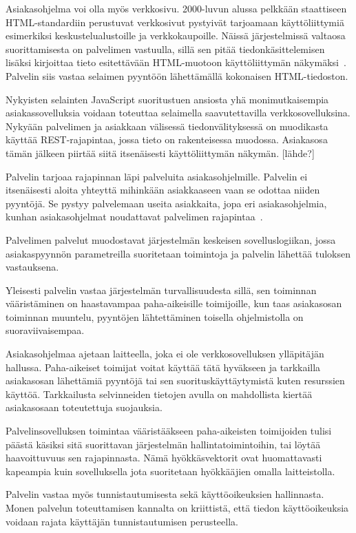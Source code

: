 \documentclass[12pt]{article}
\begin{document}
Asiakasohjelma voi olla myös verkkosivu. 2000-luvun alussa
pelkkään staattiseen HTML-standardiin perustuvat verkkosivut pystyivät
tarjoamaan käyttöliittymiä esimerkiksi keskustelualustoille ja verkkokaupoille.
Näissä järjestelmissä valtaosa suorittamisesta on palvelimen vastuulla,
sillä sen pitää tiedonkäsittelemisen lisäksi kirjoittaa tieto
esitettävään HTML-muotoon käyttöliittymän näkymäksi~\cite{tatsubori_html_2009}. Palvelin
siis vastaa selaimen pyyntöön lähettämällä kokonaisen HTML-tiedoston.

Nykyisten selainten JavaScript suoritustuen ansiosta yhä
monimutkaisempia asiakassovelluksia voidaan toteuttaa
selaimella saavutettavilla verkkosovelluksina.
Nykyään palvelimen ja asiakkaan
välisessä tiedonvälityksessä on muodikasta käyttää REST-rajapintaa, jossa
tieto on rakenteisessa muodossa. Asiakasosa tämän jälkeen piirtää siitä
itsenäisesti käyttöliittymän näkymän. [lähde?]

Palvelin tarjoaa rajapinnan läpi palveluita asiakasohjelmille.
Palvelin ei itsenäisesti aloita yhteyttä mihinkään
asiakkaaseen vaan se odottaa niiden pyyntöjä.
Se pystyy palvelemaan useita asiakkaita, jopa
eri asiakasohjelmia, kunhan asiakasohjelmat noudattavat
palvelimen rajapintaa~\cite{sinha_client-server_1992}.

Palvelimen palvelut muodostavat järjestelmän keskeisen
sovelluslogiikan, jossa asiakaspyynnön parametreilla
suoritetaan toimintoja ja palvelin lähettää
tuloksen vastauksena.

Yleisesti palvelin vastaa järjestelmän turvallisuudesta sillä,
sen toiminnan vääristäminen on haastavampaa paha-aikeisille
toimijoille, kun taas asiakasosan toiminnan muuntelu, pyyntöjen
lähtettäminen toisella ohjelmistolla on suoraviivaisempaa.

Asiakasohjelmaa ajetaan laitteella, joka ei ole verkkosovelluksen
ylläpitäjän hallussa. Paha-aikeiset toimijat voitat käyttää tätä hyväkseen
ja tarkkailla asiakasosan lähettämiä pyyntöjä tai sen
suorituskäyttäytymistä kuten resurssien käyttöä.
Tarkkailusta selvinneiden tietojen avulla on mahdollista
kiertää asiakasosaan toteutettuja suojauksia.

Palvelinsovelluksen toimintaa vääristääkseen 
paha-aikeisten toimijoiden tulisi päästä
käsiksi sitä suorittavan järjestelmän hallintatoimintoihin, tai
löytää haavoittuvuus sen rajapinnasta. Nämä hyökkäsvektorit
ovat huomattavasti kapeampia kuin sovelluksella jota
suoritetaan hyökkääjien omalla laitteistolla.

Palvelin vastaa myös tunnistautumisesta sekä käyttöoikeuksien hallinnasta.
Monen palvelun toteuttamisen kannalta on kriittistä, että
tiedon käyttöoikeuksia voidaan rajata käyttäjän tunnistautumisen perusteella.
\end{document}
